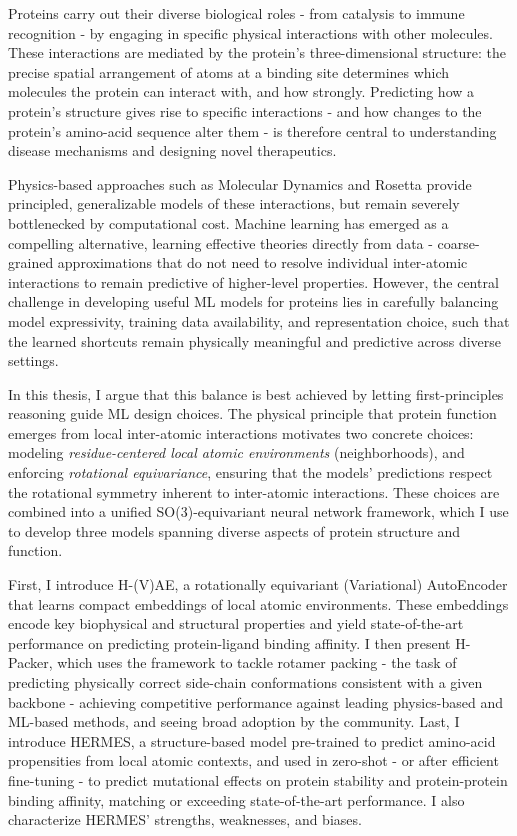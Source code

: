 

Proteins carry out their diverse biological roles - from catalysis to immune recognition - by engaging in specific
physical interactions with other molecules.
These interactions are mediated by the protein's three-dimensional structure: the precise spatial arrangement of
atoms at a binding site determines which molecules the protein can interact with, and how strongly.
Predicting how a protein's structure gives rise to specific interactions - and how changes to the protein's amino-acid
sequence alter them - is therefore central to understanding disease mechanisms and designing novel therapeutics.

Physics-based approaches such as Molecular Dynamics and Rosetta provide principled, generalizable models of these
interactions, but remain severely bottlenecked by computational cost.
Machine learning has emerged as a compelling alternative, learning effective theories directly from data -
coarse-grained approximations that do not need to resolve individual inter-atomic interactions to remain predictive of
higher-level properties.
However, the central challenge in developing useful ML models for proteins lies in carefully balancing model
expressivity, training data availability, and representation choice, such that the learned shortcuts remain
physically meaningful and predictive across diverse settings.

In this thesis, I argue that this balance is best achieved by letting first-principles reasoning guide ML design choices.
The physical principle that protein function emerges from local inter-atomic interactions motivates two concrete choices:
modeling \textit{residue-centered local atomic environments} (neighborhoods), and enforcing \textit{rotational
equivariance}, ensuring that the models' predictions respect the rotational symmetry inherent to inter-atomic interactions.
These choices are combined into a unified SO(3)-equivariant neural network framework,
which I use to develop three models spanning diverse aspects of protein structure and function.

First, I introduce H-(V)AE, a rotationally equivariant (Variational) AutoEncoder that learns
compact embeddings of local atomic environments.
These embeddings encode key biophysical and structural properties and yield state-of-the-art performance on predicting
protein-ligand binding affinity.
I then present H-Packer, which uses the framework to tackle rotamer packing - the task of
predicting physically correct side-chain conformations consistent with a given backbone - achieving competitive
performance against leading physics-based and ML-based methods, and seeing broad adoption by the community.
Last, I introduce HERMES, a structure-based model pre-trained to predict amino-acid propensities
from local atomic contexts, and used in zero-shot - or after efficient fine-tuning - to predict mutational effects on
protein stability and protein-protein binding affinity, matching or exceeding state-of-the-art performance.
I also characterize HERMES' strengths, weaknesses, and biases.

